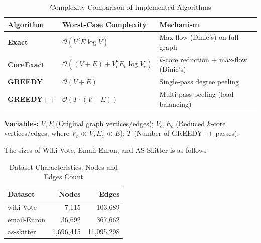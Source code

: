 \documentclass[12pt,a4paper]{article}
\begin{document}
\begin{table}[htbp]
    \centering
    \label{tab:algo_complexity}
    \renewcommand{\arraystretch}{1.2}
    \begin{tabular}{@{} l l p{6cm} @{}}
        \toprule
        \textbf{Algorithm} & \textbf{Worst-Case Complexity} & \textbf{Mechanism} \\
        \midrule
        \textbf{Exact} & $\mathcal{O}(V^2 E \log V)$ & Max-flow (Dinic's) on full graph \\
        \textbf{CoreExact} & $\mathcal{O}((V+E) + V_c^2 E_c \log V_c)$ & $k$-core reduction + max-flow (Dinic's) \\
        \textbf{GREEDY} & $\mathcal{O}(V + E)$ & Single-pass degree peeling \\
        \textbf{GREEDY++} & $\mathcal{O}(T \cdot (V + E))$ & Multi-pass peeling (load balancing) \\
        \bottomrule
    \end{tabular}
    \caption{Complexity Comparison of Implemented Algorithms}

    \vspace{1ex}
    \raggedright
    \footnotesize
    \textbf{Variables:} $V, E$ (Original graph vertices/edges); $V_c, E_c$ (Reduced $k$-core vertices/edges, where $V_c \ll V, E_c \ll E$); $T$ (Number of GREEDY++ passes).
\end{table}

The sizes of Wiki-Vote, Email-Enron, and AS-Skitter is as follows 

\begin{table}[htbp]
    \centering
    \label{tab:dataset_stats}
    \begin{tabular}{@{} l r r @{}}
        \toprule
        \textbf{Dataset} & \textbf{Nodes} & \textbf{Edges} \\
        \midrule
        wiki-Vote   & 7,115      & 103,689       \\
        email-Enron & 36,692     & 367,662       \\
        as-skitter  & 1,696,415  & 11,095,298    \\
        \bottomrule
    \end{tabular}
    \caption{Dataset Characteristics: Nodes and Edges Count}

\end{table}

\pagebreak



\end{document}
